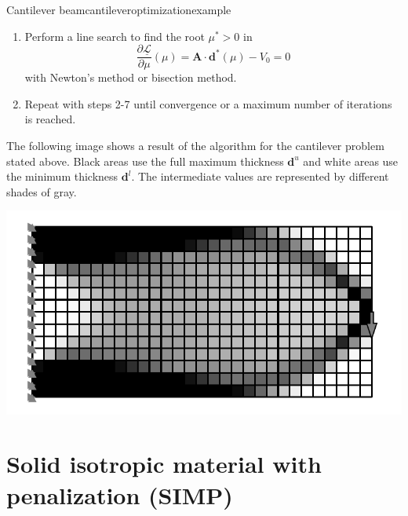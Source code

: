 \begin{example}{Cantilever beam}{cantileveroptimizationexample}
\begin{enumerate}
\begin{align}
{{                (L^k_j-d^k_j)^2}{\mu A_j}} \\
                \mathbf{d}^* (\mu) &= \max\left(\tilde{\mathbf{d}}^{l,k}, \min \left(\hat{\mathbf{d}}(\mu), \mathbf{d}_u \right)\right)
            \end{align}
        \item Perform a line search to find the root $\mu^*>0$ in 
        \begin{equation}
            \frac{\partial \underline{\mathcal{L}}}{\partial \mu}(\mu) = \mathbf{A} \cdot \mathbf{d}^* (\mu) - V_0  = 0
        \end{equation}
        with Newton's method or bisection method. 
        \item Repeat with steps 2-7 until convergence or a maximum number of iterations is reached.
    \end{enumerate}

    The following image shows a result of the algorithm for the cantilever problem stated above. Black areas use the full maximum thickness $\mathbf{d}^u$ and white areas use the minimum thickness $\mathbf{d}^l$. The intermediate values are represented by different shades of gray.

    \begin{center}
        \includegraphics[width=0.9\linewidth]{figures/cantilever_fem_optimized.pdf}
    \end{center}
    
\end{example}

\section{Solid isotropic material with penalization (SIMP)}

